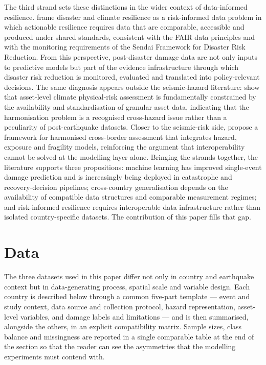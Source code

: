\documentclass[11pt,a4paper]{article}
\begin{document}
The third strand sets these distinctions in the wider context of data-informed resilience. \citet{fakhruddin2022riskinformed} frame disaster and climate resilience as a risk-informed data problem in which actionable resilience requires data that are comparable, accessible and produced under shared standards, consistent with the FAIR data principles \citep{wilkinson2016fair} and with the monitoring requirements of the Sendai Framework for Disaster Risk Reduction. From this perspective, post-disaster damage data are not only inputs to predictive models but part of the evidence infrastructure through which disaster risk reduction is monitored, evaluated and translated into policy-relevant decisions. The same diagnosis appears outside the seismic-hazard literature: \citet{bressan2024assetlevel} show that asset-level climate physical-risk assessment is fundamentally constrained by the availability and standardisation of granular asset data, indicating that the harmonisation problem is a recognised cross-hazard issue rather than a peculiarity of post-earthquake datasets. Closer to the seismic-risk side, \citet{babic2025crossborder} propose a framework for harmonised cross-border assessment that integrates hazard, exposure and fragility models, reinforcing the argument that interoperability cannot be solved at the modelling layer alone. Bringing the strands together, the literature supports three propositions: machine learning has improved single-event damage prediction and is increasingly being deployed in catastrophe and recovery-decision pipelines; cross-country generalisation depends on the availability of compatible data structures and comparable measurement regimes; and risk-informed resilience requires interoperable data infrastructure rather than isolated country-specific datasets. The contribution of this paper fills that gap.
\section{Data}
\label{sec:data}

The three datasets used in this paper differ not only in country and earthquake context but in data-generating process, spatial scale and variable design. Each country is described below through a common five-part template — event and study context, data source and collection protocol, hazard representation, asset-level variables, and damage labels and limitations — and is then summarised, alongside the others, in an explicit compatibility matrix. Sample sizes, class balance and missingness are reported in a single comparable table at the end of the section so that the reader can see the asymmetries that the modelling experiments must contend with.
\end{document}
